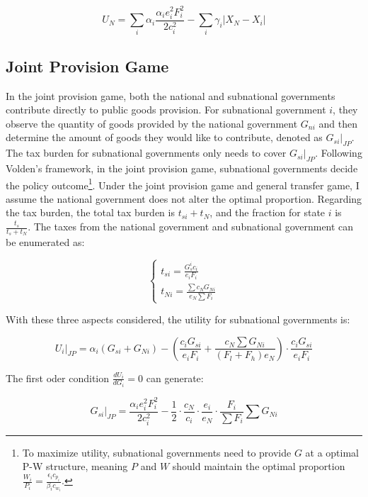 \begin{equation}
    U_N=\sum_i\alpha_i \frac{\alpha_i e_i^2 F_i^2}{2 c_i^2}-\sum_i \gamma_i|X_N-X_i| \label{utilityforN}
\end{equation}

\subsection{Joint Provision Game}

In the joint provision game, both the national and subnational governments contribute directly to public goods provision. For subnational government $i$, they observe the quantity of goods provided by the national government $G_{ni}$ and then determine the amount of goods they would like to contribute, denoted as $G_{si}|_{JP}$. The tax burden for subnational governments only needs to cover $G_{si}|_{JP}$. Following Volden's framework, in the joint provision game, subnational governments decide the policy outcome\footnote{To maximize utility, subnational governments need to provide $G$ at a optimal P-W structure, meaning $P$ and $W$ should maintain the optimal proportion $\frac{W_i}{P_i}=\frac{\epsilon_i c_{p_i}}{\beta_i c_{w_i}}$.}. Under the joint provision game and general transfer game, I assume the national government does not alter the optimal proportion. Regarding the tax burden, the total tax burden is $t_{si}+t_N$, and the fraction for state $i$ is $\frac{t_s}{t_s+t_N}$. The taxes from the national government and subnational government can be enumerated as: %

$$
    \left\{\begin{array}{l}
        t_{si}= \frac{G_s^i c_{i}}{e_i F_i} \\
        t_{Ni}=\frac{\sum c_N G_{Ni}}{e_N\sum F_i }
    \end{array}\right.
$$

With these three aspects considered, the utility for subnational governments is:

\begin{equation}
    U_i|_{JP}=\alpha_i (G_{si}+G_{Ni})-\left(\frac{c_i G_{si}}{e_i F_i}+ \frac{c_N \sum G_{Ni}}{(F_l+F_h) e_N}\right) \cdot \frac{c_i G_{si}}{e_i F_i}
\end{equation}

The first oder condition $\frac{dU_i}{dG_i}=0$ can generate:

\begin{equation}
    G_{si}|_{JP}=\frac{\alpha_ie_i^2F_i^2}{2c_i^2}-\frac{1}{2}\cdot\frac{c_N}{c_i}\cdot\frac{e_i}{e_N}\cdot\frac{F_i}{\sum F_i}\sum G_{Ni} \label{jpG}
\end{equation}

